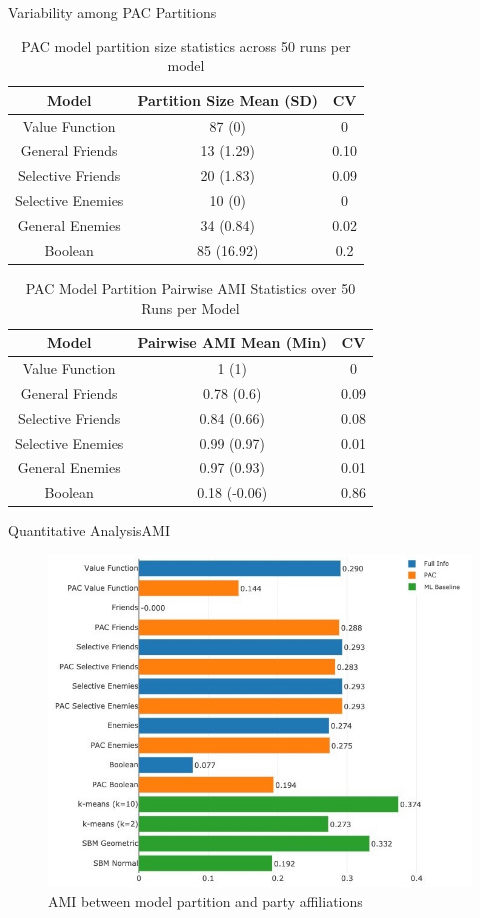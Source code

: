 \documentclass[xcolor=dvipsnames]{beamer}
\begin{document}
\begin{frame}{Variability among PAC Partitions}
  \small
  \begin{table}[H]
  \centering
  \begin{tabular}{|c|c|c|}
  \hline
    Model & Partition Size Mean (SD) & CV \\ \hline
  Value Function & 87 (0) & 0 \\
  General Friends & 13 (1.29) & 0.10  \\
  Selective Friends & 20 (1.83) & 0.09  \\
  Selective Enemies & 10 (0) & 0 \\
  General Enemies & 34 (0.84) & 0.02 \\
  Boolean & 85 (16.92) & 0.2  \\
  \hline
  \end{tabular}
  \caption{PAC model partition size statistics across 50 runs per model}
  \label{Analysis:table:pac_num_coalitions}
  \end{table}

  \begin{table}[H]
  \centering
  \begin{tabular}{|c|c|c|}
  \hline
    Model & Pairwise AMI Mean (Min) & CV \\ \hline
  Value Function & 1 (1) & 0 \\
  General Friends & 0.78 (0.6) & 0.09  \\
  Selective Friends & 0.84 (0.66) & 0.08  \\
  Selective Enemies & 0.99 (0.97) & 0.01 \\
  General Enemies & 0.97 (0.93) & 0.01 \\
  Boolean & 0.18 (-0.06) & 0.86  \\
  \hline
  \end{tabular}
  \caption{PAC Model Partition Pairwise AMI Statistics over 50 Runs per Model}
  \label{Analysis:table:pac_pairwise_amis}
  \end{table}

\end{frame}


\begin{frame}{Quantitative Analysis}{AMI}
  \begin{figure}[H]
    \centering
    \includegraphics[width=0.7\linewidth]{ami}
    \caption{AMI between model partition and party affiliations}
    \label{Analysis:fig:ami}
  \end{figure}
\end{frame}
\end{document}
